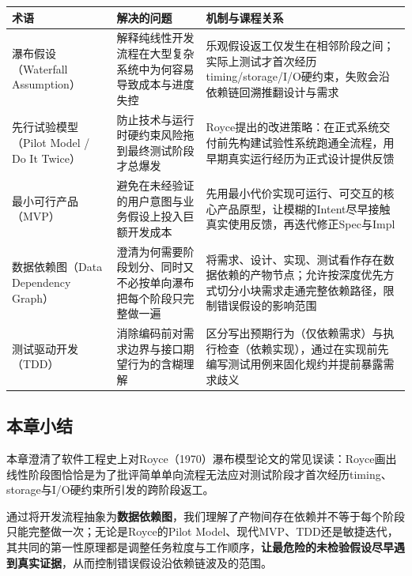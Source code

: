 \documentclass[UTF8,a4paper,11pt,fontset=fandol]{ctexart}
\begin{document}
\begin{center}\small\begin{tabularx}{\linewidth}{YYY}

\toprule

术语 & 解决的问题 & 机制与课程关系\\\midrule

瀑布假设（Waterfall Assumption） & 解释纯线性开发流程在大型复杂系统中为何容易导致成本与进度失控 & 乐观假设返工仅发生在相邻阶段之间；实际上测试才首次经历timing/storage/I/O硬约束，失败会沿依赖链回溯推翻设计与需求\\[3pt]

先行试验模型（Pilot Model / Do It Twice） & 防止技术与运行时硬约束风险拖到最终测试阶段才总爆发 & Royce提出的改进策略：在正式系统交付前先构建试验性系统跑通全流程，用早期真实运行经历为正式设计提供反馈\\[3pt]

最小可行产品（MVP） & 避免在未经验证的用户意图与业务假设上投入巨额开发成本 & 先用最小代价实现可运行、可交互的核心产品原型，让模糊的Intent尽早接触真实使用反馈，再迭代修正Spec与Impl\\[3pt]

数据依赖图（Data Dependency Graph） & 澄清为何需要阶段划分、同时又不必按单向瀑布把每个阶段只完整做一遍 & 将需求、设计、实现、测试看作存在数据依赖的产物节点；允许按深度优先方式切分小块需求走通完整依赖路径，限制错误假设的影响范围\\[3pt]

测试驱动开发（TDD） & 消除编码前对需求边界与接口期望行为的含糊理解 & 区分写出预期行为（仅依赖需求）与执行检查（依赖实现），通过在实现前先编写测试用例来固化规约并提前暴露需求歧义\\[3pt]

\bottomrule\end{tabularx}\end{center}

\subsection{本章小结}

本章澄清了软件工程史上对Royce（1970）瀑布模型论文的常见误读：Royce画出线性阶段图恰恰是为了批评简单单向流程无法应对测试阶段才首次经历timing、storage与I/O硬约束所引发的跨阶段返工。

通过将开发流程抽象为\textbf{数据依赖图}，我们理解了产物间存在依赖并不等于每个阶段只能完整做一次；无论是Royce的Pilot Model、现代MVP、TDD还是敏捷迭代，其共同的第一性原理都是调整任务粒度与工作顺序，\textbf{让最危险的未检验假设尽早遇到真实证据}，从而控制错误假设沿依赖链波及的范围。
\end{document}
